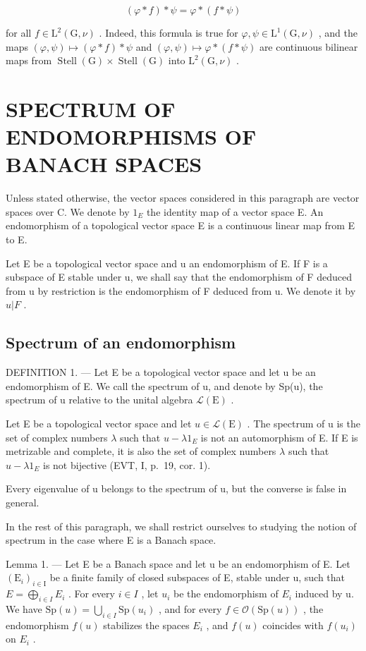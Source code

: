 \[
(\varphi * f) * \psi = \varphi * (f * \psi)\tag{9}
\]

for all \(f \in \mathrm{L}^{2}(\mathrm{G}, \nu)\) . Indeed, this formula is true for \(\varphi, \psi \in \mathrm{L}^{1}(\mathrm{G}, \nu)\) , and the maps \((\varphi, \psi) \mapsto (\varphi * f) * \psi\) and \((\varphi, \psi) \mapsto \varphi * (f * \psi)\) are continuous bilinear maps from \(\operatorname{Stell}(\mathrm{G}) \times \operatorname{Stell}(\mathrm{G})\) into \(\mathrm{L}^{2}(\mathrm{G}, \nu)\) .

\section{SPECTRUM OF ENDOMORPHISMS OF BANACH SPACES}

Unless stated otherwise, the vector spaces considered in this paragraph are vector spaces over C. We denote by \(1_{E}\) the identity map of a vector space E. An endomorphism of a topological vector space E is a continuous linear map from E to E.

Let E be a topological vector space and u an endomorphism of E. If F is a subspace of E stable under u, we shall say that the endomorphism of F deduced from u by restriction is the endomorphism of F deduced from u. We denote it by \(u|F\) .

\subsection{Spectrum of an endomorphism}

DEFINITION 1. --- Let E be a topological vector space and let u be an endomorphism of E. We call the spectrum of u, and denote by Sp(u), the spectrum of u relative to the unital algebra \(\mathcal{L}(\mathrm{E})\) .

Let E be a topological vector space and let \(u \in \mathcal{L}(\mathrm{E})\) . The spectrum of u is the set of complex numbers \(\lambda\) such that \(u - \lambda1_{E}\) is not an automorphism of E. If E is metrizable and complete, it is also the set of complex numbers \(\lambda\) such that \(u - \lambda1_{E}\) is not bijective (EVT, I, p.~19, cor. 1).

Every eigenvalue of u belongs to the spectrum of u, but the converse is false in general.

In the rest of this paragraph, we shall restrict ourselves to studying the notion of spectrum in the case where E is a Banach space.

Lemma 1. --- Let E be a Banach space and let u be an endomorphism of E. Let \((\mathrm{E}_{i})_{i\in\mathrm{I}}\) be a finite family of closed subspaces of E, stable under u, such that \(E = \bigoplus_{i\in I} E_{i}\) . For every \(i \in I\) , let \(u_{i}\) be the endomorphism of \(E_{i}\) induced by u. We have \(\mathrm{Sp}(u) = \bigcup_{i\in I} \mathrm{Sp}(u_{i})\) , and for every \(f \in \mathcal{O}(\mathrm{Sp}(u))\) , the endomorphism \(f(u)\) stabilizes the spaces \(E_{i}\) , and \(f(u)\) coincides with \(f(u_{i})\) on \(E_{i}\) .

